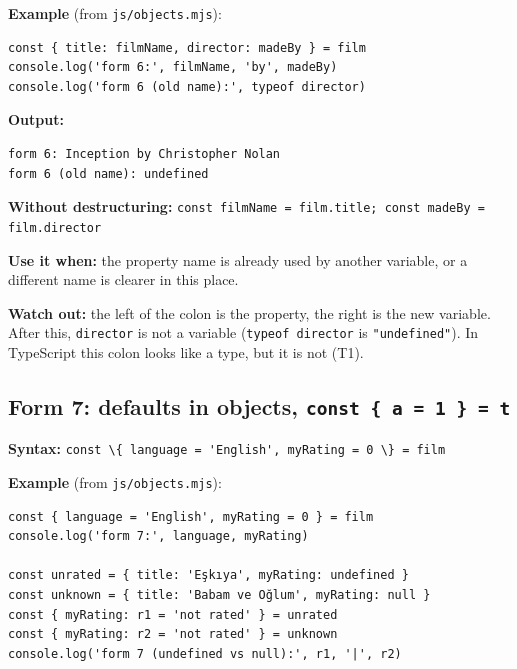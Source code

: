 \documentclass[
]{article}
\newcommand{\passthrough}[1]{#1}
\begin{document}
\textbf{Example} (from \passthrough{\lstinline!js/objects.mjs!}):

\begin{lstlisting}
const { title: filmName, director: madeBy } = film
console.log('form 6:', filmName, 'by', madeBy)
console.log('form 6 (old name):', typeof director)
\end{lstlisting}

\textbf{Output:}

\begin{lstlisting}
form 6: Inception by Christopher Nolan
form 6 (old name): undefined
\end{lstlisting}

\textbf{Without destructuring:}
\passthrough{\lstinline!const filmName = film.title; const madeBy = film.director!}

\textbf{Use it when:} the property name is already used by another
variable, or a different name is clearer in this place.

\textbf{Watch out:} the left of the colon is the property, the right is
the new variable. After this, \passthrough{\lstinline!director!} is not
a variable (\passthrough{\lstinline!typeof director!} is
\passthrough{\lstinline!"undefined"!}). In TypeScript this colon looks
like a type, but it is not (T1).

\hypertarget{form-7-defaults-in-objects-const-a-1-t}{%
\subsection{\texorpdfstring{Form 7: defaults in objects,
\texttt{const\ \{\ a\ =\ 1\ \}\ =\ t}}{Form 7: defaults in objects, const \{ a = 1 \} = t}}\label{form-7-defaults-in-objects-const-a-1-t}}

\textbf{Syntax:}
\passthrough{\lstinline!const \{ language = 'English', myRating = 0 \} = film!}

\textbf{Example} (from \passthrough{\lstinline!js/objects.mjs!}):

\begin{lstlisting}
const { language = 'English', myRating = 0 } = film
console.log('form 7:', language, myRating)

const unrated = { title: 'Eşkıya', myRating: undefined }
const unknown = { title: 'Babam ve Oğlum', myRating: null }
const { myRating: r1 = 'not rated' } = unrated
const { myRating: r2 = 'not rated' } = unknown
console.log('form 7 (undefined vs null):', r1, '|', r2)
\end{lstlisting}
\end{document}
